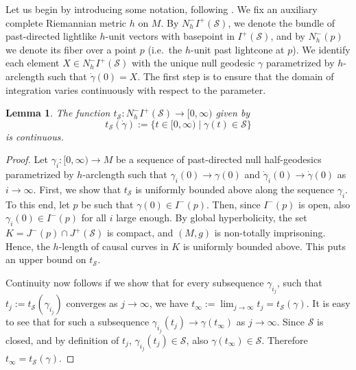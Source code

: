 \documentclass[a4paper,11pt]{amsart}
\newtheorem{lemma}[theorem]{{Lemma}}%
\newcommand{\CS}{\mathcal{S}}
\begin{document}
Let us begin by introducing some notation, following \cite{CGM16}. We fix an auxiliary complete Riemannian metric $h$ on $M$. By $N_h^-I^+(\CS)$, we denote the bundle of past-directed lightlike $h$-unit vectors with basepoint in $I^+(\CS)$, and by $N_h^-(p)$ we denote its fiber over a point $p$ (i.e.\ the $h$-unit past lightcone at $p$). We identify each element $X \in N_h^-I^+(\CS)$ with the unique null geodesic $\gamma$ parametrized by $h$-arclength such that $\dot\gamma(0) = X$. The first step is to ensure that the domain of integration varies continuously with respect to the parameter.

\begin{lemma} \label{lem:tCS}
    The function $t_\CS \colon N_h^- I^+(\CS) \to [0,\infty)$ given by
    \begin{equation}
        t_\CS(\dot\gamma) := \{ t \in [0,\infty) \mid \gamma(t) \in \CS \}
    \end{equation}
    is continuous.
\end{lemma}

\begin{proof}
    Let $\gamma_i \colon [0,\infty) \to M$ be a sequence of past-directed null half-geodesics parametrized by $h$-arclength such that $\gamma_i(0) \to \gamma(0)$ and $\dot\gamma_i(0) \to \dot\gamma(0)$ as $i \to \infty$. First, we show that $t_\CS$ is uniformly bounded above along the sequence $\gamma_i$. To this end, let $p$ be such that $\gamma(0) \in I^-(p)$. Then, since $I^-(p)$ is open, also $\gamma_i(0) \in I^-(p)$ for all $i$ large enough. By global hyperbolicity, the set $K = J^-(p) \cap J^+(\CS)$ is compact, and $(M,g)$ is non-totally imprisoning. Hence, the $h$-length of causal curves in $K$ is uniformly bounded above. This puts an upper bound on $t_\CS$.

    Continuity now follows if we show that for every subsequence $\gamma_{i_j}$, such that $t_j := t_\CS(\gamma_{i_j})$ converges as $j \to \infty$, we have $t_\infty := \lim_{j\to\infty} t_j = t_\CS(\gamma)$. It is easy to see that for such a subsequence $\gamma_{i_j} (t_j) \to \gamma(t_\infty)$ as $j \to \infty$. Since $\CS$ is closed, and by definition of $t_j$, $\gamma_{i_j} (t_j) \in \CS$, also $\gamma(t_\infty) \in \CS$. Therefore $t_\infty = t_\CS(\gamma)$. 
\end{proof}
\end{document}
